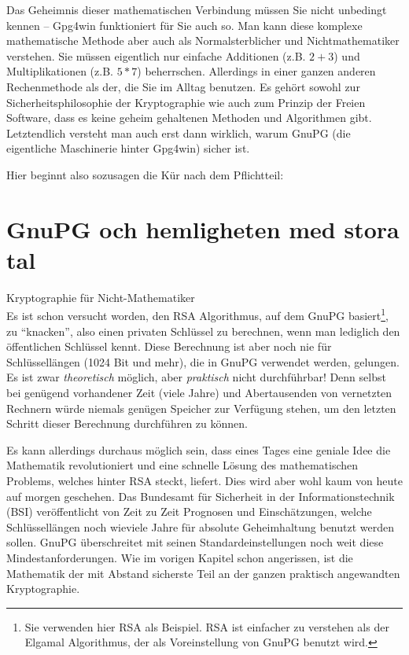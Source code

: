 \documentclass[a4paper,11pt, oneside,openright,titlepage,dvips]{scrbook}
\newcounter{chapter}
\begin{document}
Das Geheimnis dieser mathematischen Verbindung müssen Sie nicht
unbedingt kennen -- Gpg4win funktioniert für Sie auch so. Man kann
diese komplexe mathematische Methode aber auch als Normalsterblicher
und Nichtmathematiker verstehen. Sie müssen eigentlich nur einfache
Additionen (z.B. $2 + 3$) und Multiplikationen (z.B. $5 * 7$) beherrschen.
Allerdings in einer ganzen anderen Rechenmethode als der, die Sie im
Alltag benutzen.  Es gehört sowohl zur Sicherheitsphilosophie der
Kryptographie wie auch zum Prinzip der Freien Software, dass es keine
geheim gehaltenen Methoden und Algorithmen gibt. Letztendlich versteht
man auch erst dann wirklich, warum GnuPG (die eigentliche Maschinerie
hinter Gpg4win) sicher ist.

Hier beginnt also sozusagen die Kür nach dem Pflichtteil:


\clearpage
\chapter{GnuPG och hemligheten med stora tal  }
\label{ch:secretGnupg}

{\Large Kryptographie für Nicht-Mathematiker}\\

Es ist schon versucht worden, den RSA Algorithmus, auf dem GnuPG
basiert\footnote{Sie verwenden hier RSA als Beispiel. RSA ist
  einfacher zu verstehen als der Elgamal Algorithmus, der als
  Voreinstellung von GnuPG benutzt wird.}, zu "`knacken"', also einen
privaten Schlüssel zu berechnen, wenn man lediglich den
öffentlichen Schlüssel kennt.  Diese Berechnung ist aber noch nie für
Schlüssellängen (1024 Bit und mehr), die in GnuPG verwendet werden,
gelungen.  Es ist zwar \textit{theoretisch} möglich, aber
\textit{praktisch} nicht durchführbar! Denn selbst bei genügend vorhandener 
Zeit (viele Jahre)
und Abertausenden von vernetzten Rechnern würde niemals genügen Speicher zur
Verfügung stehen, um den letzten Schritt dieser Berechnung
durchführen zu können.

Es kann allerdings durchaus möglich sein, dass eines Tages eine geniale
Idee die Mathematik revolutioniert und eine schnelle Lösung des mathematischen
Problems, welches hinter RSA steckt, liefert.  Dies wird aber wohl
kaum von heute auf morgen geschehen.
Das Bundesamt für Sicherheit in der Informationstechnik (BSI) 
veröffentlicht von Zeit zu Zeit
Prognosen und Einschätzungen, welche Schlüssellängen noch wieviele
Jahre für absolute Geheimhaltung benutzt werden sollen.  GnuPG
überschreitet mit seinen Standardeinstellungen noch weit diese
Mindestanforderungen.  Wie im vorigen Kapitel schon angerissen, ist die
Mathematik der mit Abstand sicherste Teil an der ganzen praktisch
angewandten Kryptographie.
\end{document}
